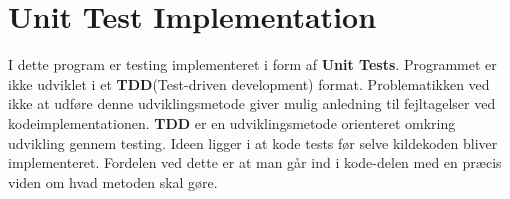 \section{Unit Test Implementation}\label{unittest}

I dette program er testing implementeret i form af \textbf{Unit Tests}. Programmet er ikke udviklet i et \textbf{TDD}(Test-driven development) format. Problematikken ved ikke at udføre denne udviklingsmetode giver mulig anledning til fejltagelser ved kodeimplementationen. \textbf{TDD} er en udviklingsmetode orienteret omkring udvikling gennem testing. Ideen ligger i at kode tests før selve kildekoden bliver implementeret. Fordelen ved dette er at man går ind i kode-delen med en præcis viden om hvad metoden skal gøre.

\vspace{5mm}

